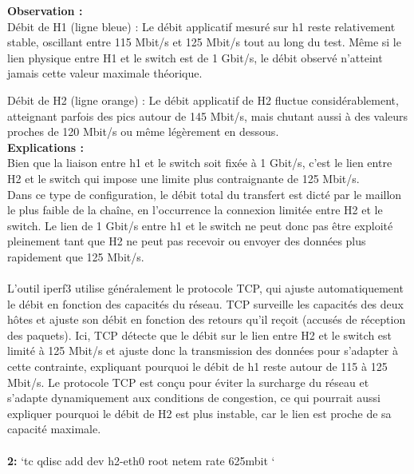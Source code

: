 \textbf{Observation :}\\
Débit de H1 (ligne bleue) : Le débit applicatif mesuré sur h1 reste relativement stable, oscillant entre 115 Mbit/s et 125 Mbit/s tout au long du test. Même si le lien physique entre H1 et le switch est de 1 Gbit/s, le débit observé n’atteint jamais cette valeur maximale théorique.

Débit de H2 (ligne orange) : Le débit applicatif de H2 fluctue considérablement, atteignant parfois des pics autour de 145 Mbit/s, mais chutant aussi à des valeurs proches de 120 Mbit/s ou même légèrement en dessous.
\vspace{1cm}
\\
\textbf{Explications :} 
\\
Bien que la liaison entre h1 et le switch soit fixée à 1 Gbit/s, c'est le lien entre H2 et le switch qui impose une limite plus contraignante de 125 Mbit/s.\\
Dans ce type de configuration, le débit total du transfert est dicté par le maillon le plus faible de la chaîne, en l’occurrence la connexion limitée entre H2 et le switch. Le lien de 1 Gbit/s entre h1 et le switch ne peut donc pas être exploité pleinement tant que H2 ne peut pas recevoir ou envoyer des données plus rapidement que 125 Mbit/s.\\
\\
L'outil iperf3 utilise généralement le protocole TCP, qui ajuste automatiquement le débit en fonction des capacités du réseau. TCP surveille les capacités des deux hôtes et ajuste son débit en fonction des retours qu’il reçoit (accusés de réception des paquets).
Ici, TCP détecte que le débit sur le lien entre H2 et le switch est limité à 125 Mbit/s et ajuste donc la transmission des données pour s’adapter à cette contrainte, expliquant pourquoi le débit de h1 reste autour de 115 à 125 Mbit/s.
Le protocole TCP est conçu pour éviter la surcharge du réseau et s’adapte dynamiquement aux conditions de congestion, ce qui pourrait aussi expliquer pourquoi le débit de H2 est plus instable, car le lien est proche de sa capacité maximale.\\
\\
\textbf{2:} `tc qdisc add dev h2-eth0 root netem rate 625mbit `
